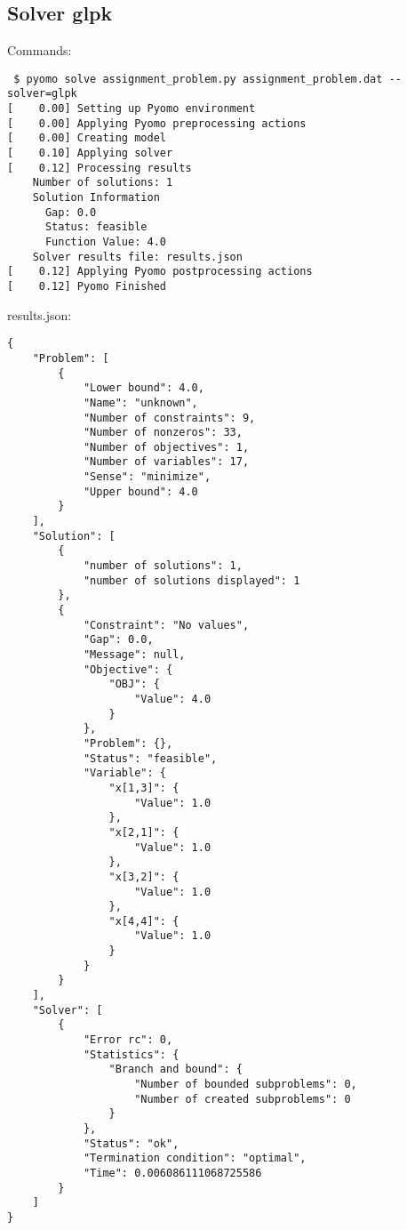 \documentclass[a4paper]{article}
\begin{document}
\subsection*{Solver glpk}
Commands:
\begin{verbatim}
 $ pyomo solve assignment_problem.py assignment_problem.dat --solver=glpk
[    0.00] Setting up Pyomo environment
[    0.00] Applying Pyomo preprocessing actions
[    0.00] Creating model
[    0.10] Applying solver
[    0.12] Processing results
    Number of solutions: 1
    Solution Information
      Gap: 0.0
      Status: feasible
      Function Value: 4.0
    Solver results file: results.json
[    0.12] Applying Pyomo postprocessing actions
[    0.12] Pyomo Finished
\end{verbatim}
results.json:
\begin{verbatim}
{
    "Problem": [
        {
            "Lower bound": 4.0, 
            "Name": "unknown", 
            "Number of constraints": 9, 
            "Number of nonzeros": 33, 
            "Number of objectives": 1, 
            "Number of variables": 17, 
            "Sense": "minimize", 
            "Upper bound": 4.0
        }
    ], 
    "Solution": [
        {
            "number of solutions": 1, 
            "number of solutions displayed": 1
        }, 
        {
            "Constraint": "No values", 
            "Gap": 0.0, 
            "Message": null, 
            "Objective": {
                "OBJ": {
                    "Value": 4.0
                }
            }, 
            "Problem": {}, 
            "Status": "feasible", 
            "Variable": {
                "x[1,3]": {
                    "Value": 1.0
                }, 
                "x[2,1]": {
                    "Value": 1.0
                }, 
                "x[3,2]": {
                    "Value": 1.0
                }, 
                "x[4,4]": {
                    "Value": 1.0
                }
            }
        }
    ], 
    "Solver": [
        {
            "Error rc": 0, 
            "Statistics": {
                "Branch and bound": {
                    "Number of bounded subproblems": 0, 
                    "Number of created subproblems": 0
                }
            }, 
            "Status": "ok", 
            "Termination condition": "optimal", 
            "Time": 0.006086111068725586
        }
    ]
}\end{verbatim}

\end{document}
